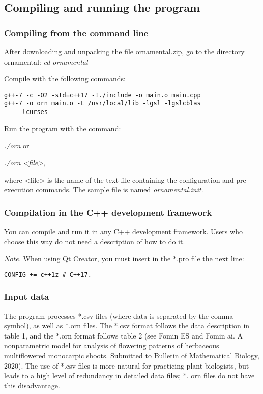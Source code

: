 \documentclass[a4paper]{article}
\begin{document}
\subsection{Compiling and running the program}

\subsubsection{Compiling from the command line}
After downloading and unpacking the file ornamental.zip, go to the directory
ornamental: \textit{cd ornamental}
 
Compile with the following commands:
\begin{lstlisting}
g++-7 -c -O2 -std=c++17 -I./include -o main.o main.cpp
g++-7 -o orn main.o -L /usr/local/lib -lgsl -lgslcblas 
	-lcurses
\end{lstlisting}
Run the program with the command:

\textit{./orn} or

\textit{./orn <file>}, 

where <file> is the name of the text file containing the configuration and pre-execution commands. The sample file is named \textit{ornamental.init}.

\subsubsection{Compilation in the C++ development framework}
You can compile and run it in any C++ development framework. Users who choose this way do not need a description of how to do it.

\textit{Note.} When using Qt Creator, you must insert in the *.pro file the next line: 
\begin{lstlisting}
CONFIG += c++1z # C++17.
\end{lstlisting}

\subsubsection{Input data}
The program processes *.csv files (where data is separated by the comma symbol), as well as *.orn files. The *.csv format follows the data description in table 1, and the *.orn format follows table 2 (see Fomin ES and Fomin ai. A nonparametric model for analysis of flowering patterns of herbaceous multiflowered monocarpic shoots. Submitted to Bulletin of Mathematical Biology, 2020). The use of *.csv files is more natural for practicing plant biologists, but leads to a high level of redundancy in detailed data files; *. orn files do not have this disadvantage.
\end{document}
